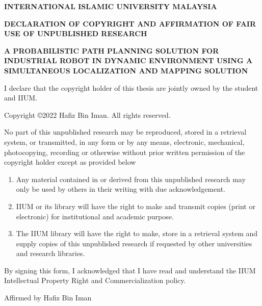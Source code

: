 
\begin{mdframed}
\begin{center}
{\CHAPTERfontsize \textbf{INTERNATIONAL ISLAMIC UNIVERSITY MALAYSIA}}
\vspace{24pt}
\par
{\CHAPTERfontsize \textbf{DECLARATION OF COPYRIGHT AND AFFIRMATION OF
FAIR USE OF UNPUBLISHED RESEARCH}}
\vspace{24pt}
\par
{\CHAPTERfontsize \uppercase{\textbf{
	A Probabilistic Path Planning Solution for Industrial Robot in Dynamic Environment using A Simultaneous Localization and Mapping Solution
}}}
\vspace{24pt}

I declare that the copyright holder of this thesis are jointly owned by the student and IIUM.
\par
\vspace{12pt}
\footnotesize{Copyright \copyright 2022 Hafiz Bin Iman. All rights reserved.}
\end{center}
  \vspace{12pt}
  \par
  \noindent
No part of this unpublished research may be reproduced, stored in a retrieval
system, or transmitted, in any form or by any means, electronic, mechanical,
photocopying, recording or otherwise without prior written permission of the
copyright holder except as provided below
\begin{enumerate}
\item Any material contained in or derived from this unpublished research
may only be used by others in their writing with due acknowledgement.
\item IIUM or its library will have the right to make and transmit copies
(print or electronic) for institutional and academic purpose.
\item The IIUM library will have the right to make, store in a retrieval system
and supply copies of this unpublished research if requested by other
universities and research libraries.
\end{enumerate}
By signing this form, I acknowledged that I have read and understand the
IIUM Intellectual Property Right and Commercialization policy.
\par
\vspace{48pt}

\noindent Affirmed by Hafiz Bin Iman
\par
\vspace{72pt}
\noindent
  \begin{minipage}{0.4\linewidth}
    \centering
  \end{minipage}
  \hfill
  \begin{minipage}{0.4\linewidth}
    \centering
    \Date
  \end{minipage}

\vspace{21pt}
\end{mdframed}

\newpage

